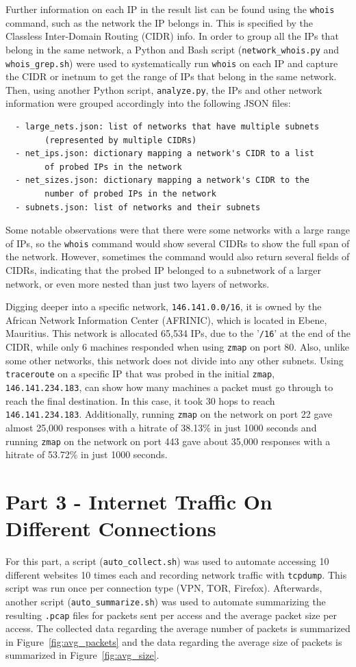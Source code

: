 \documentclass[11pt]{article}
\begin{document}
Further information on each IP in the result list can be found using the \verb|whois| command, such
as the network the IP belongs in. This is specified by the Classless Inter-Domain Routing (CIDR)
info. In order to group all the IPs that belong in the same network, a Python and Bash script 
(\verb|network_whois.py| and \verb|whois_grep.sh|) were used to systematically run \verb|whois|
on each IP and capture the CIDR or inetnum to get the range of IPs that belong in the same network.
Then, using another Python script, \verb|analyze.py|, the IPs and other network information were
grouped accordingly into the following JSON files:
\begin{verbatim}
  - large_nets.json: list of networks that have multiple subnets
        (represented by multiple CIDRs)
  - net_ips.json: dictionary mapping a network's CIDR to a list
        of probed IPs in the network
  - net_sizes.json: dictionary mapping a network's CIDR to the
        number of probed IPs in the network
  - subnets.json: list of networks and their subnets
\end{verbatim}

Some notable observations were that there were some networks with a large range of IPs, so the 
\verb|whois| command would show several CIDRs to show the full span of the network. However,
sometimes the command would also return several fields of CIDRs, indicating that the probed IP
belonged to a subnetwork of a larger network, or even more nested than just two layers of
networks.

Digging deeper into a specific network, \verb|146.141.0.0/16|, it is owned by the African Network 
Information Center (AFRINIC), which is located in Ebene, Mauritius. This network is allocated 65,534
IPs, due to the '\verb|/16|' at the end of the CIDR, while only 6 machines responded when using
\verb|zmap| on port 80. Also, unlike some other networks, this network does not divide into any other
subnets. Using \verb|traceroute| on a specific IP that was probed in the initial \verb|zmap|,
\verb|146.141.234.183|, can show how many machines a packet must go through to reach the final
destination. In this case, it took 30 hops to reach \verb|146.141.234.183|. Additionally, running
\verb|zmap| on the network on port 22 gave almost 25,000 responses with a hitrate of 38.13\% in just
1000 seconds and running \verb|zmap| on the network on port 443 gave about 35,000 responses with a hitrate
of 53.72\% in just 1000 seconds. 
\section*{Part 3 - Internet Traffic On Different Connections}
For this part, a script (\verb|auto_collect.sh|) was used to automate accessing 10 different
websites 10 times each and recording network traffic with \verb|tcpdump|. This script was run
once per connection type (VPN, TOR, Firefox). Afterwards, another script (\verb|auto_summarize.sh|)
was used to automate summarizing the resulting \verb|.pcap| files for packets sent per access
and the average packet size per access. The collected data regarding the average number of packets
is summarized in Figure~\ref{fig:avg_packets} and the data regarding the average size of packets
is summarized in Figure~\ref{fig:avg_size}.
\end{document}

